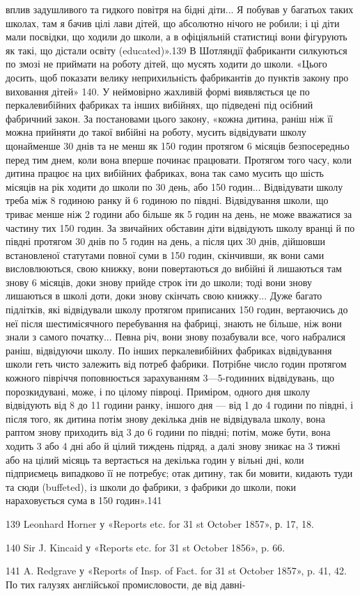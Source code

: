 вплив задушливого та гидкого повітря на бідні діти... Я побував
у багатьох таких школах, там я бачив цілі лави дітей, що абсолютно
нічого не робили; і ці діти мали посвідки, що ходили до
школи, а в офіціяльній статистиці вони фігурують як такі, що
дістали освіту (educated)».139 В Шотляндії фабриканти силкуються
по змозі не приймати на роботу дітей, що мусять ходити до школи.
«Цього досить, щоб показати велику неприхильність фабрикантів
до пунктів закону про виховання дітей» 140. У неймовірно
жахливій формі виявляється це по перкалевибійних фабриках та
інших вибійнях, що підведені під осібний фабричний закон.
За постановами цього закону, «кожна дитина, раніш ніж її можна
прийняти до такої вибійні на роботу, мусить відвідувати школу
щонайменше 30 днів та не менш як 150 годин протягом 6 місяців
безпосередньо перед тим днем, коли вона вперше починає працювати.
Протягом того часу, коли дитина працює на цих вибійних
фабриках, вона так само мусить що шість місяців на рік ходити
до школи по 30 день, або 150 годин... Відвідувати школу треба
між 8 годиною ранку й 6 годиною по півдні. Відвідування школи,
що триває менше ніж 2  години або більше як 5 годин на день,
не може вважатися за частину тих 150 годин. За звичайних обставин
діти відвідують школу вранці й по півдні протягом 30 днів
по 5 годин на день, а після цих 30 днів, дійшовши встановленої
статутами повної суми в 150 годин, скінчивши, як вони сами
висловлюються, свою книжку, вони повертаються до вибійні
й лишаються там знову 6 місяців, доки знову прийде строк іти
до школи; тоді вони знову лишаються в школі доти, доки знову
скінчать свою книжку... Дуже багато підлітків, які відвідували
школу протягом приписаних 150 годин, вертаючись до неї після
шестимісячного перебування на фабриці, знають не більше, ніж
вони знали з самого початку... Певна річ, вони знову позабували
все, чого набралися раніш, відвідуючи школу. По інших перкалевибійних
фабриках відвідування школи геть чисто залежить від
потреб фабрики. Потрібне число годин протягом кожного півріччя
поповнюється зарахуванням 3—5-годинних відвідувань, що порозкидувані,
може, і по цілому півроці. Приміром, одного дня
школу відвідують від 8 до 11 години ранку, іншого дня — від
1 до 4 години по півдні, і після того, як дитина потім знову декілька
днів не відвідувала школу, вона раптом знову приходить
від 3 до 6 години по півдні; потім, може бути, вона ходить 3 або 4 дні
або й цілий тиждень підряд, а далі знову зникає на 3 тижні або
на цілий місяць та вертається на декілька годин у вільні дні,
коли підприємець випадково її не потребує; отак дитину, так би
мовити, кидають туди та сюди (buffeted), із школи до фабрики,
з фабрики до школи, поки нараховується сума в 150 годин».141

139    Leonhard Horner у «Reports etc. for 31 st October 1857», р. 17, 18.

140    Sir J. Kincaid у «Reports etc. for 31 st October 1856», p. 66.

141    A. Redgrave у «Reports of Insp. of Fact. for 31 st October
1857», p. 41, 42. По тих галузях англійської промисловости, де від давні-
